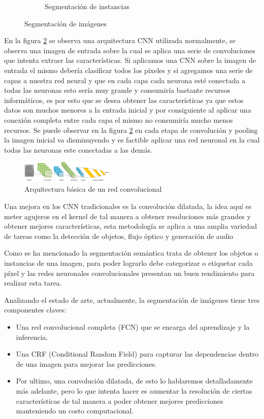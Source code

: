 \documentclass[conference,compsoc]{IEEEtran}
\begin{document}
\begin{figure}[H]
\begin{subfigure}{.3\linewidth}
\caption{Segmentación de instancias}
\end{subfigure}
\caption{\label{fig:formasdesegmentacion}Segmentación de imágenes}
\end{figure}


En la figura \ref{fig:cnn} se observa una arquitectura CNN utilizada normalmente, se observa una imagen de entrada sobre la cual se aplica una serie de convoluciones que intenta extraer las características. Si aplicamos una CNN sobre la imagen de entrada el mismo debería clasificar todos los píxeles y si agregamos una serie de capas a nuestra red neural y que en cada capa cada neurona esté conectada a todas las neuronas esto sería muy grande y consumiría bastante recursos informáticos, es por esto que se desea obtener las características ya que estos datos son muchos menores a la entrada inicial y por consiguiente al aplicar una conexión completa entre cada capa el mismo no consumiría mucho menos recursos. Se puede observar en la figura \ref{fig:cnn} en cada etapa de convolución y pooling la imagen inicial va disminuyendo y es factible aplicar una red neuronal en la cual todas las neuronas este conectadas a las demás.

\begin{figure}[H]
\centering
\includegraphics[width=0.4\textwidth]{cnn.png}
\caption{\label{fig:cnn}Arquitectura básica de un red convolucional}
\end{figure}


Una mejora en los CNN tradicionales es la convolución dilatada, la idea aquí es meter agujeros en el kernel de tal manera a obtener resoluciones más grandes y obtener mejores características, esta metodología se aplica a una amplia variedad de tareas como la detección de objetos, flujo óptico y generación de audio\cite{segconv}

Como se ha mencionado la segmentación semántica trata de obtener los objetos o instancias de una imagen, para poder lograrlo debe categorizar o etiquetar cada píxel y las redes neuronales convolucionales presentan un buen rendimiento para realizar esta tarea.

Analizando el estado de arte, actualmente, la segmentación de imágenes tiene tres componentes claves:
\begin{itemize}
  \item Una red convolucional completa (FCN) que se encarga del aprendizaje y la inferencia.
  \item Una CRF (Conditional Random Field) para capturar las dependencias dentro de una imagen para mejorar las predicciones.
  \item Por ultimo, una convolución dilatada, de esto lo hablaremos detalladamente más adelante, pero lo que intenta hacer es aumentar la resolución de ciertas características de tal manera a poder obtener mejores predicciones manteniendo un costo computacional.
\end{itemize}
\end{document}
